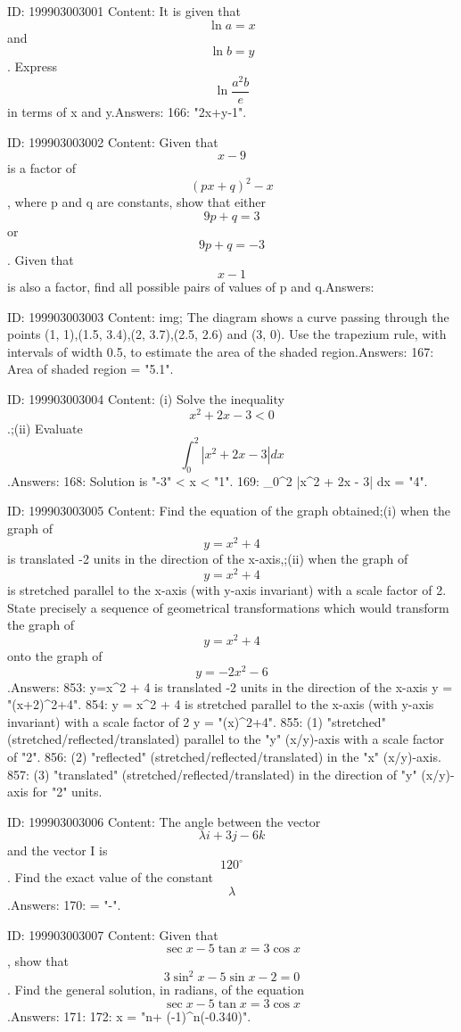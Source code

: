 \documentclass{article}
\begin{document}
ID: 199903003001
Content:
It is given that \[\ln a = x\] and \[\ln b = y\]. Express \[\ln \frac {a^2 b}{e}\] in terms of x and y.Answers:
166: \ln {} \equiv "2x+y-1".

ID: 199903003002
Content:
Given that \[x - 9\] is a factor of \[(px + q)^2 - x\], where p and q are constants, show that either \[9p + q = 3\] or \[9p + q = -3\]. Given that \[x - 1\] is also a factor, find all possible pairs of values of p and q.Answers:

ID: 199903003003
Content:
img; The diagram shows a curve passing through the points (1, 1),(1.5, 3.4),(2, 3.7),(2.5, 2.6) and (3, 0). Use the trapezium rule, with intervals of width 0.5, to estimate the area of the shaded region.Answers:
167: Area of shaded region = "5.1".

ID: 199903003004
Content:
(i) Solve the inequality \[x^2 + 2x - 3 < 0\].;(ii) Evaluate \[\int_{0}^{2} |x^2 + 2x - 3| dx\].Answers:
168: Solution is "-3" < x < "1".
169: \int_0^2 |x^2 + 2x - 3| dx = "4".

ID: 199903003005
Content:
Find the equation of the graph obtained;(i) when the graph of \[y = x^2 + 4\] is translated -2 units in the direction of the x-axis,;(ii) when the graph of \[y = x^2 + 4\] is stretched parallel to the x-axis (with y-axis invariant) with a scale factor of 2. State precisely a sequence of geometrical transformations which would transform the graph of \[y = x^2 + 4\] onto the graph of \[y = -2x^2 - 6\].Answers:
853: y=x^2 + 4 is translated -2 units in the direction of the x-axis \Rightarrow y = "(x+2)^2+4".
854: y = x^2 + 4 is stretched parallel to the x-axis (with y-axis invariant) with a scale factor of 2 \Rightarrow y = "(x)^2+4".
855: (1) "stretched" (stretched/reflected/translated) parallel to the "y" (x/y)-axis with a scale factor of "2".
856: (2) "reflected" (stretched/reflected/translated) in the "x" (x/y)-axis.
857: (3) "translated" (stretched/reflected/translated) in the direction of "y" (x/y)-axis for "2" units.

ID: 199903003006
Content:
The angle between the vector \[\lambda i + 3j - 6k\] and the vector I is \[120^{\circ}\]. Find the exact value of the constant \[\lambda\].Answers:
170: \lambda = "-".

ID: 199903003007
Content:
Given that \[\sec x - 5\tan x = 3\cos x\], show that \[3\sin^2x - 5\sin x - 2 = 0\]. Find the general solution, in radians, of the equation \[\sec x - 5\tan x = 3\cos x\].Answers:
171: 
172: x = "n\pi + (-1)^n(-0.340)".
\end{document}
